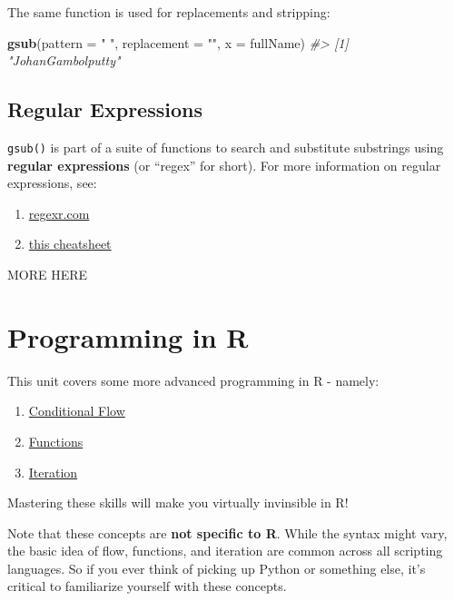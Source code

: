 \documentclass[]{book}
\newenvironment{Shaded}{\begin{snugshade}}{\end{snugshade}}
\newcommand{\KeywordTok}[1]{\textcolor[rgb]{0.13,0.29,0.53}{\textbf{#1}}}
\newcommand{\DataTypeTok}[1]{\textcolor[rgb]{0.13,0.29,0.53}{#1}}
\newcommand{\StringTok}[1]{\textcolor[rgb]{0.31,0.60,0.02}{#1}}
\newcommand{\CommentTok}[1]{\textcolor[rgb]{0.56,0.35,0.01}{\textit{#1}}}
\newcommand{\NormalTok}[1]{#1}
\providecommand{\tightlist}{%
  \setlength{\itemsep}{0pt}\setlength{\parskip}{0pt}}
\begin{document}
The same function is used for replacements and stripping:

\begin{Shaded}
\begin{Highlighting}[]
\KeywordTok{gsub}\NormalTok{(}\DataTypeTok{pattern =} \StringTok{" "}\NormalTok{, }\DataTypeTok{replacement =} \StringTok{""}\NormalTok{, }\DataTypeTok{x =}\NormalTok{ fullName) }
\CommentTok{#> [1] "JohanGambolputty"}
\end{Highlighting}
\end{Shaded}

\hypertarget{regular-expressions}{\section{Regular
Expressions}\label{regular-expressions}}

\texttt{gsub()} is part of a suite of functions to search and substitute
substrings using \textbf{regular expressions} (or ``regex'' for short).
For more information on regular expressions, see:

\begin{enumerate}
\def\labelenumi{\arabic{enumi}.}
\tightlist
\item
  \href{https://regexr.com/}{regexr.com}
\item
  \href{https://medium.com/factory-mind/regex-tutorial-a-simple-cheatsheet-by-examples-649dc1c3f285}{this
  cheatsheet}
\end{enumerate}

MORE HERE

\chapter{Programming in R}\label{programming-in-r}

This unit covers some more advanced programming in R - namely:

\begin{enumerate}
\def\labelenumi{\arabic{enumi}.}
\tightlist
\item
  \protect\hyperlink{conditional-flow}{Conditional Flow}
\item
  \protect\hyperlink{functions-1}{Functions}
\item
  \protect\hyperlink{iteration}{Iteration}
\end{enumerate}

Mastering these skills will make you virtually invinsible in R!

Note that these concepts are \textbf{not specific to R}. While the
syntax might vary, the basic idea of flow, functions, and iteration are
common across all scripting languages. So if you ever think of picking
up Python or something else, it's critical to familiarize yourself with
these concepts.
\end{document}
